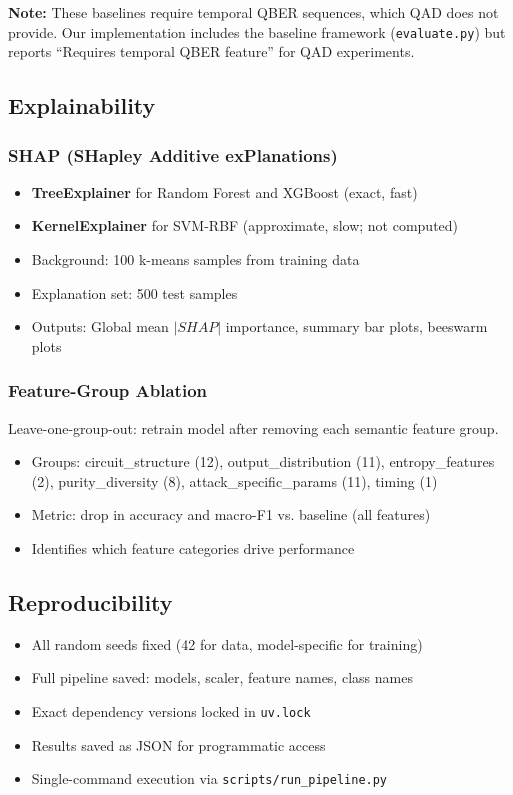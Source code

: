 \textbf{Note:} These baselines require temporal QBER sequences, which QAD does not provide. Our implementation includes the baseline framework (\texttt{evaluate.py}) but reports ``Requires temporal QBER feature'' for QAD experiments.

\subsection{Explainability}
\label{sec:explainability}

\subsubsection{SHAP (SHapley Additive exPlanations)}
\begin{itemize}
    \item \textbf{TreeExplainer} for Random Forest and XGBoost (exact, fast)
    \item \textbf{KernelExplainer} for SVM-RBF (approximate, slow; not computed)
    \item Background: 100 k-means samples from training data
    \item Explanation set: 500 test samples
    \item Outputs: Global mean $|SHAP|$ importance, summary bar plots, beeswarm plots
\end{itemize}

\subsubsection{Feature-Group Ablation}
Leave-one-group-out: retrain model after removing each semantic feature group.
\begin{itemize}
    \item Groups: circuit\_structure (12), output\_distribution (11), entropy\_features (2), purity\_diversity (8), attack\_specific\_params (11), timing (1)
    \item Metric: drop in accuracy and macro-F1 vs. baseline (all features)
    \item Identifies which feature categories drive performance
\end{itemize}

\subsection{Reproducibility}
\begin{itemize}
    \item All random seeds fixed (42 for data, model-specific for training)
    \item Full pipeline saved: models, scaler, feature names, class names
    \item Exact dependency versions locked in \texttt{uv.lock}
    \item Results saved as JSON for programmatic access
    \item Single-command execution via \texttt{scripts/run\_pipeline.py}
\end{itemize}